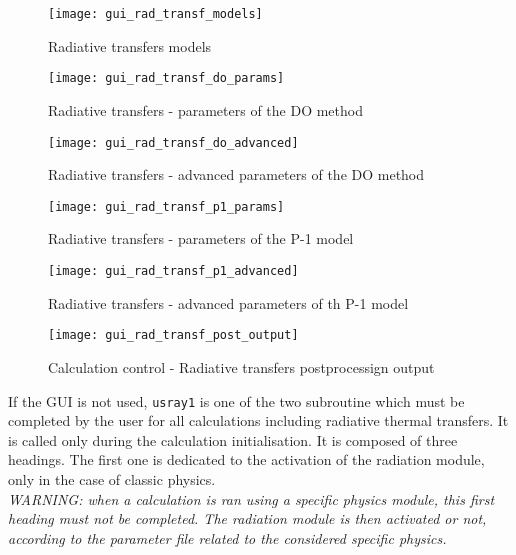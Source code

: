 {{{\begin{figure}[ht]
\begin{center}
\texttt{[image: gui\_rad\_transf\_models]}
\caption{Radiative transfers models}
\label{fig:0_ray}
\end{center}
\end{figure}

\begin{figure}[ht]
\begin{center}
\texttt{[image: gui\_rad\_transf\_do\_params]}
\caption{Radiative transfers - parameters of the DO method}
\label{fig:1_ray}
\end{center}
\end{figure}

\begin{figure}[ht]
\begin{center}
\texttt{[image: gui\_rad\_transf\_do\_advanced]}
\caption{Radiative transfers - advanced parameters of the DO method}
\label{fig:2_ray}
\end{center}
\end{figure}

\begin{figure}[ht]
\begin{center}
\texttt{[image: gui\_rad\_transf\_p1\_params]}
\caption{Radiative transfers - parameters of the P-1 model}
\label{fig:3_ray}
\end{center}
\end{figure}

\begin{figure}[ht]
\begin{center}
\texttt{[image: gui\_rad\_transf\_p1\_advanced]}
\caption{Radiative transfers - advanced parameters of th P-1 model}
\label{fig:4_ray}
\end{center}
\end{figure}

\begin{figure}[ht]
\begin{center}
\texttt{[image: gui\_rad\_transf\_post\_output]}
\caption{Calculation control - Radiative transfers postprocessign output}
\label{fig:5_ray}
\end{center}
\end{figure}

If the GUI is not used, \texttt{usray1} is one of the two subroutine which must be completed by the user for all
calculations including radiative thermal transfers. It is called only during the calculation initialisation. It is composed of three headings. The first one is dedicated to the activation
of the radiation module, only in the case of classic physics. \\
{\em WARNING: when a calculation is ran using a specific physics module,
this first heading must not be completed. The radiation module is then
activated or not, according to the parameter file related to the considered
specific physics.} \\

}}}
